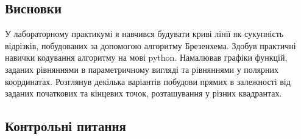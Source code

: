 \documentclass[a4paper,14pt]{extarticle} %
\begin{document}
\subsection*{Висновки}

У лабораторному практикумі я навчився будувати криві лінії як сукупність відрізків, побудованих за 
допомогою алгоритму Брезенхема. Здобув практичні навички кодування алгоритму на мові python. Намалював 
графіки функцій, заданих рівняннями в параметричному вигляді та рівняннями у полярних координатах. Розглянув 
декілька варіантів побудови прямих в залежності від заданих початкових та кінцевих точок, розташування у 
різних квадрантах.

\subsection*{Контрольні питання}
\end{document}
